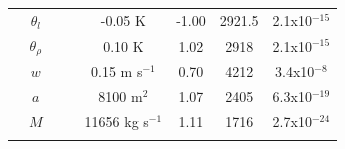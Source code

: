 \documentclass[acp]{copernicus}
\begin{document}
\begin{table}[t]
\begin{tabular}{lccccccc}
\rowcolor[gray]{0.85}
& $\theta_l$ & & & -0.05 K                  & -1.00 & 2921.5 & 2.1x10$^{-15}$  \\
\rowcolor[gray]{0.85}
& $\theta_\rho$ & & & 0.10 K                &  1.02 & 2918  & 2.1x10$^{-15}$ \\
\rowcolor[gray]{0.85}
& $w$         & & &  0.15 m s$^{-1}$         &  0.70 & 4212   & 3.4x10$^{-8}$  \\
\rowcolor[gray]{0.85}
& $a$         & & &  8100 m$^2$             &  1.07 & 2405 & 6.3x10$^{-19}$ \\
\rowcolor[gray]{0.85}
& $M$         & & &  11656 kg s$^{-1}$    &  1.11 & 1716 & 2.7x10$^{-24}$ \\
\bottomhline
\end{tabular}
\end{table}





\end{document}
